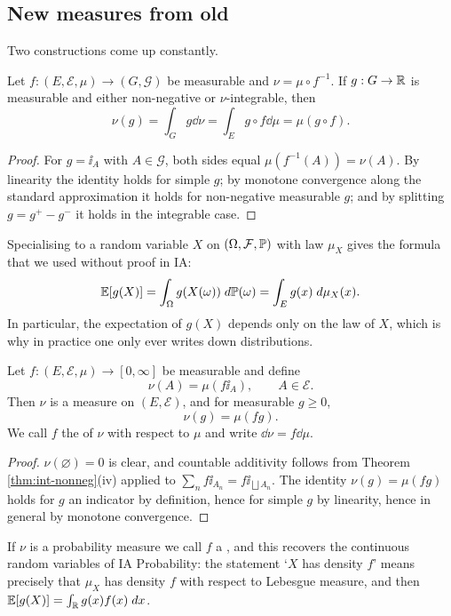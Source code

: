 \documentclass[a4paper]{scrartcl}
\newcommand{\cE}{\mathcal{E}}
\newcommand{\cF}{\mathcal{F}}
\newcommand{\cG}{\mathcal{G}}
\newcommand{\ind}{\ii}
\begin{document}
\subsection{New measures from old}

Two constructions come up constantly.

\begin{proposition}\label{prop:change-var}
	Let $f : (E,\cE,\mu)\to(G,\cG)$ be measurable and $\nu = \mu\circ f^{-1}$. If $g : G \to \mathbb{R}$ is measurable and either non-negative or $\nu$-integrable, then
	$$
	\nu(g) = \int_G g\dd\nu = \int_E g\circ f\dd\mu = \mu(g \circ f).
	$$
\end{proposition}
\begin{proof}
	For $g = \ind_A$ with $A \in \cG$, both sides equal $\mu(f^{-1}(A)) = \nu(A)$. By linearity the identity holds for simple $g$; by monotone convergence along the standard approximation it holds for non-negative measurable $g$; and by splitting $g = g^+-g^-$ it holds in the integrable case.
\end{proof}

Specialising to a random variable $X$ on $(\Omega,\cF,\PP)$ with law $\mu_X$ gives the formula that we used without proof in IA:
$$
\mathbb{E}[g(X)] = \int_\Omega g(X(\omega))\; d\mathbb{P}(\omega) = \int_E g(x)\; d\mu_X(x).
$$
In particular, the expectation of $g(X)$ depends only on the law of $X$, which is why in practice one only ever writes down distributions.

\begin{proposition}\label{prop:density}
	Let $f : (E,\cE,\mu)\to[0,\infty]$ be measurable and define
	$$
	\nu(A) = \mu(f\ind_A), \qquad A \in \cE.
	$$
	Then $\nu$ is a measure on $(E,\cE)$, and for measurable $g \geq 0$,
	$$
	\nu(g) = \mu(fg).
	$$
	We call $f$ the  of $\nu$ with respect to $\mu$ and write $\dd\nu = f\dd\mu$.
\end{proposition}
\begin{proof}
	$\nu(\varnothing)=0$ is clear, and countable additivity follows from Theorem \ref{thm:int-nonneg}(iv) applied to $\sum_n f\ind_{A_n} = f\ind_{\bigsqcup A_n}$. The identity $\nu(g)=\mu(fg)$ holds for $g$ an indicator by definition, hence for simple $g$ by linearity, hence in general by monotone convergence.
\end{proof}

If $\nu$ is a probability measure we call $f$ a , and this recovers the continuous random variables of IA Probability: the statement `$X$ has density $f$' means precisely that $\mu_X$ has density $f$ with respect to Lebesgue measure, and then $\mathbb{E}[g(X)] = \int_{\mathbb{R}} g(x)f(x)\; d x$.
\end{document}
